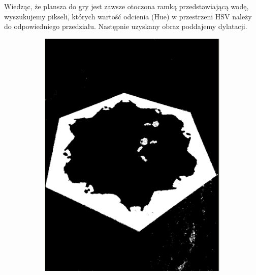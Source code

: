 \documentclass[a4paper]{article}
\begin{document}
    Wiedząc, że plansza do gry jest zawsze otoczona ramką przedstawiającą wodę, wyszukujemy pikseli, których wartość odcienia (Hue) w przestrzeni HSV należy do odpowiedniego przedziału. Następnie uzyskany obraz poddajemy dylatacji.
    \begin{figure}[h]
        \begin{subfigure}[]{.5\linewidth}
        \includegraphics[width=\linewidth]{pictures/steps/find_water.png}


\end{subfigure}
\end{figure}
\end{document}
